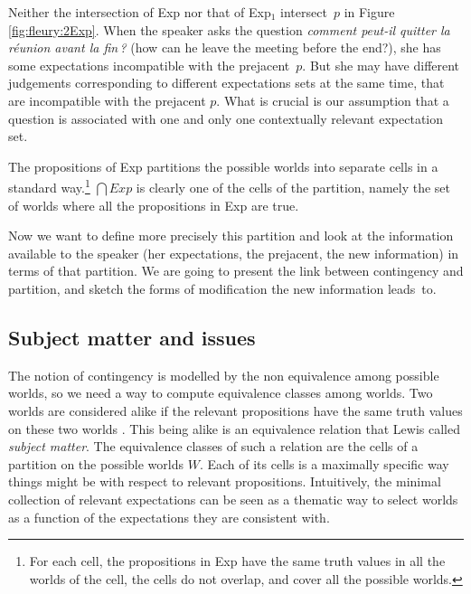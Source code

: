\documentclass[output=paper,colorlinks,citecolor=brown,
]{langscibook}
\begin{document}
Neither the intersection of Exp 
nor that of Exp$_1$ intersect~$p$ in  Figure \ref{fig:fleury:2Exp}.
When the speaker asks the question \textit{comment peut-il quitter la r\'eunion avant la fin\,?} (how can he leave the meeting before the end?), 
she has some expectations incompatible with the prejacent~$p$.
But she may have different judgements corresponding to different expectations sets at the same time, that are incompatible with the prejacent $p$. What is crucial  is our assumption that a question is associated with one and only one {contextually relevant} expectation set.


The propositions of Exp partitions the possible worlds into separate 
cells in a standard way.\footnote{For each cell, the propositions in Exp have the same truth values in all the worlds of the cell, the cells do not overlap, and cover all the possible worlds.} $\bigcap Exp$ is clearly one of the cells of the partition, namely the set of worlds where all the propositions in Exp are true.


Now we want to define more precisely this partition and look at the information available to the speaker (her expectations, {the prejacent,} the new information) in terms of that partition. We are going to present the link between contingency and partition, and sketch the forms of modification the new information leads~to.


\subsection{Subject matter and issues}\label{sec:fleury:subjectMatter}%
The notion of contingency is modelled by the non equivalence among possible worlds, so we need a way to compute equivalence classes among worlds.
Two worlds are considered {alike} if the relevant propositions have the same truth values on these two worlds  \citep{Lewis88}. %
This being alike is an {equivalence relation} that Lewis called 
\textit{subject matter}.
The equivalence classes of such a relation are the cells of a {partition} on the possible worlds $W$.
Each of its cells 
is a maximally specific way things might be with respect to relevant propositions. 
Intuitively, 
the minimal collection of relevant expectations can be seen as a thematic way to select worlds as a function of the expectations they are consistent with. 
\end{document}
